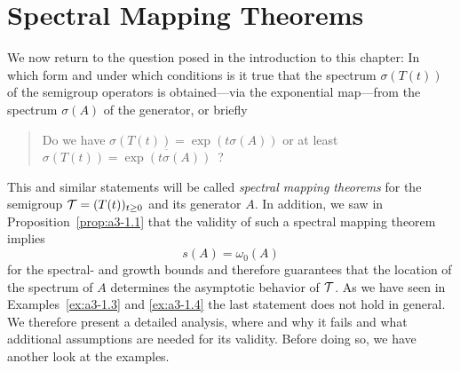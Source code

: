 \section{Spectral Mapping Theorems}\label{sec:a3-6}
We now return to the question posed in the introduction to this chapter: In which form and under which conditions is it true that the spectrum $\sigma(T(t))$ of the semigroup operators is obtained---via the exponential map---from the spectrum $\sigma(A)$ of the generator, or briefly
\begin{quote}
Do we have  $\sigma(T(t)) = \exp(t \sigma(A) )$  or at least 
 $\sigma(T(t)) = \overline{\exp(t\sigma(A))}$ \,?
\end{quote}
This and similar statements will be called \emph{spectral mapping theorems} for the semigroup $\mathcal{T} = (T(t))_{t \geq 0}$ and its generator $A$.
In addition, we saw in Proposition~\ref{prop:a3-1.1} that the validity of such a spectral mapping theorem implies
\[
s(A) = \omega_{0}(A)
\]
for the spectral- and growth bounds and therefore guarantees that the location of the spectrum of $A$ determines the asymptotic behavior of $\mathcal{T}$.
As we have seen in Examples~\ref{ex:a3-1.3} and \ref{ex:a3-1.4} the last statement does not hold in general.
We therefore present a detailed analysis, where and why it fails and what additional assumptions are needed for its validity.
Before doing so, we have another look at the examples.
